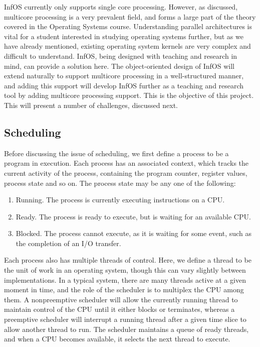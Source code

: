 \documentclass[bsc,frontabs,twoside,singlespacing,parskip,deptreport]{infthesis}     %
\begin{document}
InfOS currently only supports single core processing. However, as discussed, multicore processing is a very prevalent field, and forms a large part of the theory covered in the Operating Systems course. Understanding parallel architectures is vital for a student interested in studying operating systems further, but as we have already mentioned, existing operating system kernels are very complex and difficult to understand. InfOS, being designed with teaching and research in mind, can provide a solution here. The object-oriented design of InfOS will extend naturally to support multicore processing in a well-structured manner, and adding this support will develop InfOS further as a teaching and research tool by adding multicore processing support. This is the objective of this project. This will present a number of challenges, discussed next.

\subsection{Scheduling} \label{scheduling-challenges}
Before discussing the issue of scheduling, we first define a process to be a program in execution. Each process has an associated context, which tracks the current activity of the process, containing the program counter, register values, process state and so on. The process state may be any one of the following:

\begin{enumerate}
    \item{Running. The process is currently executing instructions on a CPU.}
    \item{Ready. The process is ready to execute, but is waiting for an available CPU.}
    \item{Blocked. The process cannot execute, as it is waiting for some event, such as the completion of an I/O transfer.}
\end{enumerate}

Each process also has multiple threads of control. Here, we define a thread to be the unit of work in an operating system, though this can vary slightly between implementations. In a typical system, there are many threads active at a given moment in time, and the role of the scheduler is to multiplex the CPU among them. A nonpreemptive scheduler will allow the currently running thread to maintain control of the CPU until it either blocks or terminates, whereas a preemptive scheduler will interrupt a running thread after a given time slice to allow another thread to run. The scheduler maintains a queue of ready threads, and when a CPU becomes available, it selects the next thread to execute.
\end{document}
